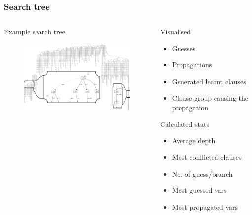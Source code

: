 \documentclass[xcolor=usenames,xcolor=svgnames,table,slidestop,compress,mathserif]{beamer}
\begin{document}
\frame
{
\frametitle{Search tree}
\begin{columns}[T]
  \begin{column}{8.5cm}
  \begin{beamerboxesrounded}[shadow=true]{Example search tree}

  \begin{figure}[ht]
  \begin{center}
  \includegraphics[width=8.6cm]{search_graph/search_graph2}
  \end{center}
  \end{figure}
  
  \end{beamerboxesrounded}
  \end{column}
  
  \begin{column}{3cm}
   \begin{beamerboxesrounded}[shadow=true]{Visualised}
   \tiny
    \begin{itemize}
     \item Guesses
     \item Propagations
     \item Generated learnt clauses
     \item Clause group causing the propagation
    \end{itemize}
   \end{beamerboxesrounded}
   
   \bigskip
   \begin{beamerboxesrounded}[shadow=true]{Calculated stats}
   \tiny
    \begin{itemize}
     \item Average depth
     \item Most conflicted clauses
     \item No. of guess/branch
     \item Most guessed vars
     \item Most propagated vars
    \end{itemize}
   \end{beamerboxesrounded}
 
  \end{column}
  
\end{columns}
}
\end{document}
